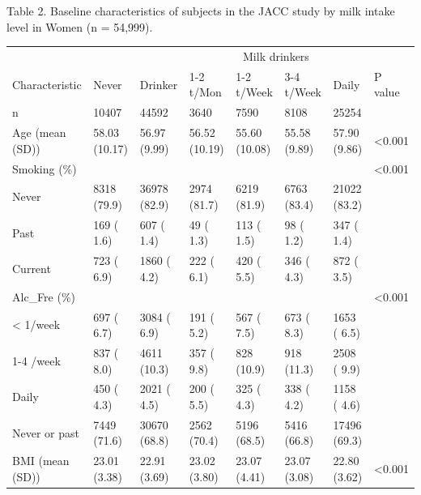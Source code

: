 \documentclass[]{tufte-handout}
\begin{document}
\begin{table}[ht]
Table 2. Baseline characteristics of subjects in the JACC study by milk intake level in Women (n = 54,999).

\centering
\fontsize{8}{10}\selectfont
\begin{tabular}[t]{llllllll}
\toprule
\multicolumn{1}{c}{ } & \multicolumn{1}{c}{} & \multicolumn{1}{c}{} & \multicolumn{4}{c}{Milk drinkers} & \multicolumn{1}{c}{} \\
\cmidrule(l{3pt}r{3pt}){4-7}
Characteristic & Never & Drinker & 1-2 t/Mon & 1-2 t/Week & 3-4 t/Week & Daily & P value\\
\midrule
\rowcolor{gray!6}  n & 10407 & 44592 & 3640 & 7590 & 8108 & 25254 & \\
Age (mean (SD)) & 58.03 (10.17) & 56.97 (9.99) & 56.52 (10.19) & 55.60 (10.08) & 55.58 (9.89) & 57.90 (9.86) & <0.001\\
\rowcolor{gray!6}  Smoking (\%) &  &  &  &  &  &  & <0.001\\
\hspace{1em}Never & 8318 (79.9) & 36978 (82.9) & 2974 (81.7) & 6219 (81.9) & 6763 (83.4) & 21022 (83.2) & \\
\rowcolor{gray!6}  \hspace{1em}Past & 169 ( 1.6) & 607 ( 1.4) & 49 ( 1.3) & 113 ( 1.5) & 98 ( 1.2) & 347 ( 1.4) & \\
\hspace{1em}Current & 723 ( 6.9) & 1860 ( 4.2) & 222 ( 6.1) & 420 ( 5.5) & 346 ( 4.3) & 872 ( 3.5) & \\
\rowcolor{gray!6}  Alc\_Fre (\%) &  &  &  &  &  &  & <0.001\\
\hspace{1em}< 1/week & 697 ( 6.7) & 3084 ( 6.9) & 191 ( 5.2) & 567 ( 7.5) & 673 ( 8.3) & 1653 ( 6.5) & \\
\rowcolor{gray!6}  \hspace{1em}1-4 /week & 837 ( 8.0) & 4611 (10.3) & 357 ( 9.8) & 828 (10.9) & 918 (11.3) & 2508 ( 9.9) & \\
\hspace{1em}Daily & 450 ( 4.3) & 2021 ( 4.5) & 200 ( 5.5) & 325 ( 4.3) & 338 ( 4.2) & 1158 ( 4.6) & \\
\rowcolor{gray!6}  \hspace{1em}Never or past & 7449 (71.6) & 30670 (68.8) & 2562 (70.4) & 5196 (68.5) & 5416 (66.8) & 17496 (69.3) & \\
BMI (mean (SD)) & 23.01 (3.38) & 22.91 (3.69) & 23.02 (3.80) & 23.07 (4.41) & 23.07 (3.08) & 22.80 (3.62) & <0.001\\

\end{tabular}
\end{table}
\end{document}
